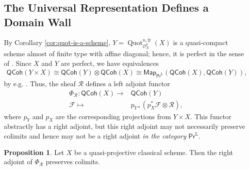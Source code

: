 \documentclass{article}
\numberwithin{equation}{section}
\theoremstyle{quest}
\theoremstyle{definition}
\newtheorem{prop}[thm]{Proposition}
\theoremstyle{remark}
\DeclareMathOperator{\Quot}{Quot}
\begin{document}
\subsection{The Universal Representation Defines a Domain Wall}
By Corollary \ref{cor:quot-is-a-scheme}, $Y= \Quot^{n,\text{fr}}_{\mathscr{O}_X^n}(X)$ is a quasi-compact scheme almost of finite type with affine diagonal; hence, it is perfect in the sense of \cite{BFN}. Since $X$ and $Y$ are perfect, we have equivalences
\begin{align*}
	\mathsf{QCoh}(Y\times X)\cong \mathsf{QCoh}(Y)\otimes \mathsf{QCoh}(X)\cong \mathsf{Map}_{\mathsf{Pr}^{\text{L}}}(\mathsf{QCoh}(X),\mathsf{QCoh}(Y)),
\end{align*} 
by e.g. \cite[Proposition 3.3.4.2]{GR}. Thus, the sheaf $\mathscr{R}$ defines a left adjoint functor
\begin{align*}
	\Phi_{\mathscr{R}}:\mathsf{QCoh}(X)\to& \mathsf{QCoh}(Y)\\
	\mathscr{F}\mapsto &p_{Y*}\left( p_X^*\mathscr{F}\otimes \mathscr{R} \right) ,
\end{align*} 
where $p_{Y}$ and $p_X$ are the corresponding projections from $Y\times X$. This functor abstractly has a right adjoint, but this right adjoint may not necessarily preserve colimits and hence may not be a right adjoint \textit{in the category} $\mathsf{Pr}^{\text{L}}$.
\begin{prop}\label{prop:R-is-a-domain-wall}
	Let $X$ be a quasi-projective classical scheme. Then the right adjoint of $\Phi_{\mathscr{R}}$ preserves colimits. 
\end{prop} 
\end{document}
